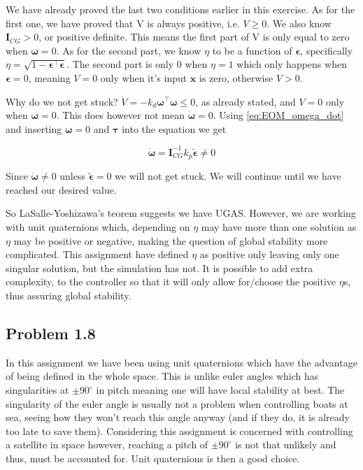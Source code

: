 We have already proved the last two conditions earlier in this exercise. As for the first one, we have proved that V is always positive, i.e. $V \geq 0$. We also know $\mathbf{I}_{CG} > 0$, or positive definite. This means the first part of V is only equal to zero when $\boldsymbol{\omega} = 0$. As for the second part, we know $\eta$ to be a function of $\boldsymbol{\epsilon}$, specifically $\eta = \sqrt{1 - \boldsymbol{\epsilon}^\top\boldsymbol{\epsilon}}$. The second part is only 0 when $\eta = 1$ which only happens when $\boldsymbol{\epsilon} = 0$, meaning $V = 0$ only when it's input $\mathbf{x}$ is zero, otherwise $V > 0$. 


Why do we not get stuck? $\dot{V} = -k_d\boldsymbol{\omega}^\top\boldsymbol{\omega} \leq 0$, as already stated, and $V = 0$ only when $\boldsymbol{\omega} = 0$. This does however not mean $\dot{\boldsymbol{\omega}} = 0$. Using \eqref{eq:EOM_omega_dot} and inserting $\boldsymbol{\omega} = 0$ and $\boldsymbol{\tau}$ into the equation we get

\begin{equation}
    \dot{\boldsymbol{\omega}} = \mathbf{I}_{CG}^{-1}k_p\tilde{\boldsymbol{\epsilon}} \neq 0
\end{equation}

Since $\dot{\boldsymbol{\omega}} \neq 0$ unless $\tilde{\boldsymbol{\epsilon}} = 0$ we will not get stuck. We will continue until we have reached our desired value.

So LaSalle-Yoshizawa's teorem suggests we have UGAS. However, we are working with unit quaternions which, depending on $\eta$ may have more than one solution as $\eta$ may be positive or negative, making the question of global stability more complicated. This assignment have defined $\eta$ as positive only leaving only one singular solution, but the simulation has not. It is possible to add extra complexity, to the controller so that it will only allow for/choose the positive $\eta$s, thus assuring global stability. 


\subsection*{Problem 1.8}

In this assignment we have been using unit quaternions which have the advantage of being defined in the whole space. This is unlike euler angles which has singularities at $\pm 90^\circ$ in pitch meaning one will have local stability at best. The singularity of the euler angle is usually not a problem when controlling boats at sea, seeing how they won't reach this angle anyway (and if they do, it is already too late to save them). Considering this assignment is concerned with controlling a satellite in space however, reaching a pitch of $\pm 90^\circ$ is not that unlikely and thus, must be accounted for. Unit quaternions is then a good choice.

